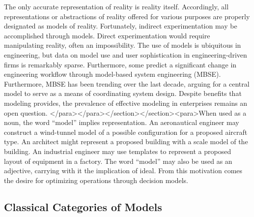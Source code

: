 The only accurate representation of reality is reality itself. Accordingly, all representations or abstractions of reality offered for various purposes are properly designated as models of reality. Fortunately, indirect experimentation may be accomplished through models. Direct experimentation would require manipulating reality, often an impossibility.
The use of models is ubiquitous in engineering, but data on model use and user sophistication in engineering-driven firms is remarkably sparse. Furthermore, some predict a significant change in engineering workflow through model-based system engineering (MBSE). Furthermore, MBSE has been trending over the last decade, arguing for a central model to serve as a means of coordinating system design. Despite benefits that modeling provides, the prevalence of effective modeling in enterprises remains an open question.
</para></para></section></section><para>When used as a noun, the word “model” implies representation. An aeronautical engineer may construct a wind-tunnel model of a possible configuration for a proposed aircraft type. An architect might represent a proposed building with a scale model of the building. An industrial engineer may use templates to represent a proposed layout of equipment in a factory. The word “model” may also be used as an adjective, carrying with it the implication of ideal. From this motivation comes the desire for optimizing operations through decision models.

\subsection{Classical Categories of Models}

